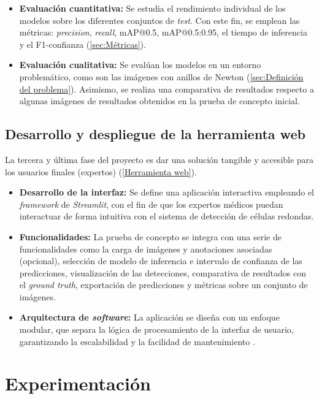 \documentclass[12pt,a4paper,onecolumn,oneside]{report}
\begin{document}
\begin{itemize}
\begin{itemize}
    \item \textbf{Evaluación cuantitativa:} Se estudia el rendimiento individual de los modelos sobre los diferentes conjuntos de \textit{test}. Con este fin, se emplean las métricas: 
    \textit{precision}, \textit{recall}, mAP@0.5, mAP@0.5:0.95, el tiempo de inferencia y el F1-confianza (\autoref{sec:Métricas}). 
    \item \textbf{Evaluación cualitativa:} Se evalúan los modelos en un entorno problemático, como son las imágenes con anillos de Newton (\autoref{sec:Definición del problema}). Asimismo, se realiza una comparativa de resultados respecto a algunas imágenes de resultados obtenidos en la prueba de concepto inicial. 
  \end{itemize}
\end{itemize}

\section{Desarrollo y despliegue de la herramienta web}
\label{Despliegue de la herramienta web}

La tercera y última fase del proyecto es dar una solución tangible y accesible para los usuarios finales (expertos) (\autoref{Herramienta web}).

\begin{itemize}
  \item \textbf{Desarrollo de la interfaz:} Se define una aplicación interactiva empleando el \textit{framework} de \textit{Streamlit}, con el fin de que los expertos médicos puedan interactuar de forma intuitiva con el sistema de detección de células redondas.
  \item \textbf{Funcionalidades:} La prueba de concepto se integra con una serie de funcionalidades como la carga de imágenes y anotaciones asociadas (opcional), selección de modelo de inferencia e intervalo de confianza de las predicciones, 
  visualización de las detecciones, comparativa de resultados con el \textit{ground truth}, exportación de predicciones y métricas sobre un conjunto de imágenes. 
  \item \textbf{Arquitectura de \textit{software}:} La aplicación se diseña con un enfoque modular, que separa la lógica de procesamiento de la interfaz de usuario, garantizando la escalabilidad y la facilidad de mantenimiento \cite{repoTFM}.
\end{itemize}

\chapter{Experimentación} %
\label{Experimentación}
\end{document}
